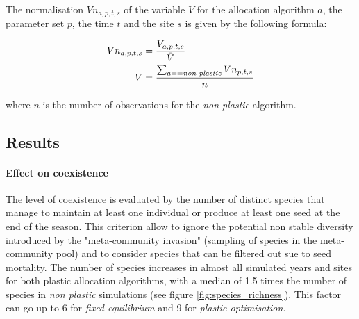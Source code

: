 The normalisation $Vn_{a, p, t, s}$ of the variable $V$ for the allocation algorithm $a$, the parameter set $p$, the time $t$ and the site $s$ is given by the following formula:

\begin{align}
Vn_{a, p, t, s} &= \frac{V_{a, p, t, s}}{ \bar{V} }\\
\bar{V} &= \frac{\sum_{a == \text{\textit{non plastic}}}{} Vn_{p, t, s} }{n}
\end{align}

where $n$ is the number of observations for the \textit{non plastic} algorithm.

\subsection{Results}

%

\paragraph{Effect on coexistence}

The level of coexistence is evaluated by the number of distinct species that manage to maintain at least one individual or produce at least one seed at the end of the season. This criterion allow to ignore the potential non stable diversity introduced by the "meta-community invasion" (sampling of species in the meta-community pool) and to consider species that can be filtered out sue to seed mortality. The number of species increases in almost all simulated years and sites for both plastic allocation algorithms, with a median of 1.5 times the number of species in \textit{non plastic} simulations (see figure \ref{fig:species_richness}). This factor can go up to 6 for \textit{fixed-equilibrium} and 9 for \textit{plastic optimisation}.


